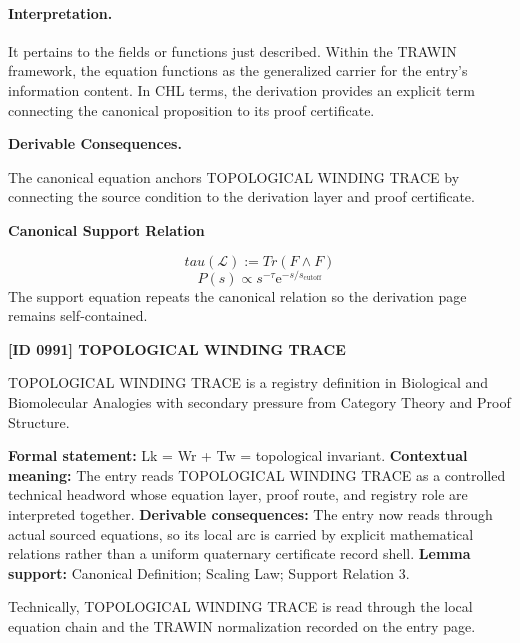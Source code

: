 \paragraph{Interpretation.}
It pertains to the fields or functions just described. Within the TRAWIN framework, the equation functions as the generalized carrier for the entry’s information content. In CHL terms, the derivation provides an explicit term connecting the canonical proposition to its proof certificate.

\par\vspace{0.35em}
\noindent\textbf{Derivable Consequences.}\quad
\begingroup
\footnotesize
\raggedright
The canonical equation anchors TOPOLOGICAL WINDING TRACE by connecting the source condition to the derivation layer and proof certificate.
\par\endgroup

\noindent\textbf{Canonical Support Relation}\par
\[
tau(\mathcal{L}):=Tr(F\wedge F)
\]
\[
P(s) \propto s^{-\tau} \mathrm{e}^{-s/s_{\text{cutoff}}}
\]
\noindent The support equation repeats the canonical relation so the derivation page remains self-contained.\par

\clearpage
\noindent\textbf{[ID 0991] TOPOLOGICAL WINDING TRACE}\par
\vspace{0.35em}
\begingroup\small
{}
TOPOLOGICAL WINDING TRACE is a registry definition in Biological and Biomolecular Analogies with secondary pressure from Category Theory and Proof Structure.

\begingroup\footnotesize\setlength{\emergencystretch}{3em}\sloppy
\textbf{Formal statement:} Lk = Wr + Tw = topological invariant. \textbf{Contextual meaning:} The entry reads TOPOLOGICAL WINDING TRACE as a controlled technical headword whose equation layer, proof route, and registry role are interpreted together. \textbf{Derivable consequences:} The entry now reads through actual sourced equations, so its local arc is carried by explicit mathematical relations rather than a uniform quaternary certificate record shell. \textbf{Lemma support:} Canonical Definition; Scaling Law; Support Relation 3.\par
\endgroup

Technically, TOPOLOGICAL WINDING TRACE is read through the local equation chain and the TRAWIN normalization recorded on the entry page.

